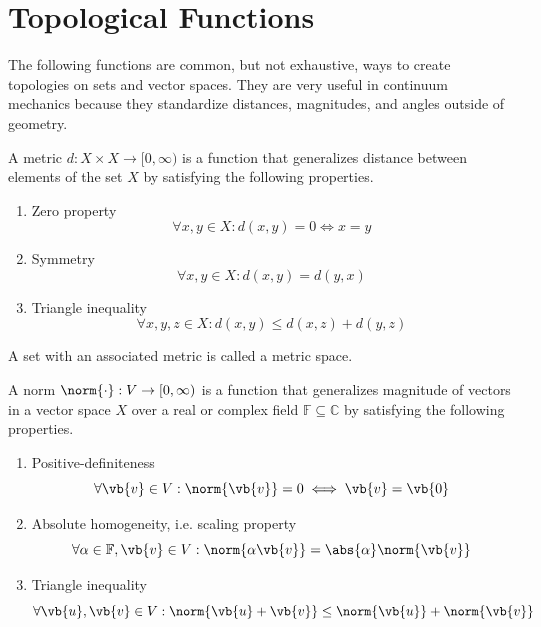 \section{Topological Functions}

The following functions are common, but not exhaustive, ways to create topologies on sets and vector spaces. They are very useful in continuum mechanics because they standardize distances, magnitudes, and angles outside of geometry.

\begin{definition}[Metric]
	A metric $d: X \times X \rightarrow [0, \infty)$ is a function that generalizes distance between elements of the set $X$ by satisfying the following properties.
	\begin{enumerate}
		\item Zero property
		\begin{equation}
			\forall x, y \in X: d(x, y) = 0 \iff x = y
		\end{equation}
		\item Symmetry
		\begin{equation}
			\forall x, y \in X: d(x, y) = d(y, x)
		\end{equation}
		\item Triangle inequality
		\begin{equation}
			\forall x, y, z \in X: d(x, y) \leq d(x, z) + d(y, z)
		\end{equation}
	\end{enumerate}
\end{definition}

A set with an associated metric is called a metric space.

\begin{definition}[Norm]
	A norm $\norm{\cdot}: V \rightarrow [0, \infty)$ is a function that generalizes magnitude of vectors in a vector space $X$ over a real or complex field $\mathbb{F} \subseteq \mathbb{C}$ by satisfying the following properties.
	\begin{enumerate}
		\item Positive-definiteness
		\begin{equation}
			\forall \vb{v} \in V: \norm{\vb{v}} = 0 \iff \vb{v} = \vb{0}
		\end{equation}
		\item Absolute homogeneity, i.e. scaling property
		\begin{equation}
			\forall \alpha \in \mathbb{F}, \vb{v} \in V: \norm{\alpha \vb{v}} = \abs{\alpha} \norm{\vb{v}}
		\end{equation}
		\item Triangle inequality
		\begin{equation}
			\forall \vb{u}, \vb{v} \in V: \norm{\vb{u} + \vb{v}} \leq \norm{\vb{u}} + \norm{\vb{v}}
		\end{equation}
	\end{enumerate}
\end{definition}

